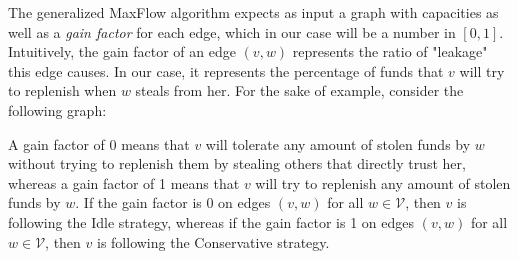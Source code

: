 The generalized MaxFlow algorithm expects as input a graph with capacities as well as a \textit{gain factor} for each edge,
which in our case will be a number in $\left[0, 1\right]$. Intuitively, the gain factor of an edge $\left(v, w\right)$
represents the ratio of "leakage" this edge causes. In our case, it represents the percentage of funds that $v$ will try to
replenish when $w$ steals from her. For the sake of example, consider the following graph:

\begin{center}
\end{center}

A gain factor of 0 means that $v$ will tolerate any amount of stolen funds by $w$ without trying to replenish them by stealing
others that directly trust her, whereas a gain factor of 1 means that $v$ will try to replenish any amount of stolen funds by
$w$. If the gain factor is 0 on edges $\left(v, w\right)$ for all $w \in \mathcal{V}$, then $v$ is following the Idle
strategy, whereas if the gain factor is 1 on edges $\left(v, w\right)$ for all $w \in \mathcal{V}$, then $v$ is following the
Conservative strategy.
